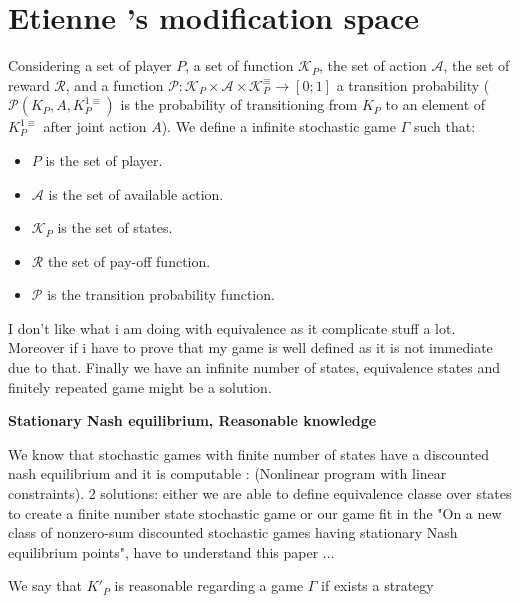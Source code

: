 \section{Etienne 's modification space}

\begin{mydef}
	Considering a set of player $P$, a set of function $\mathcal{K}_P$, the set of action $\mathcal{A}$, the set of reward $\mathcal{R}$, and a function $\mathcal{P} : \mathcal{K}_P \times \mathcal{A} \times \mathcal{K}_P^\equiv \rightarrow [0;1]$ a transition probability ($\mathcal{P}(K_P,A,K_P^{1\equiv})$ is the probability of transitioning from $K_P$ to an element of $K_P^{1\equiv}$ after joint action $A$).
	We define a infinite stochastic game $\Gamma$  such that:
	\begin{itemize}
		\item $P$ is the set of player.
		\item $\mathcal{A}$ is the set of available action.
		\item $\mathcal{K}_P$ is the set of states.
		\item $\mathcal{R}$ the set of pay-off function.
		\item $\mathcal{P}$ is the transition probability function.
	\end{itemize}
\end{mydef}

\begin{myrem}
	I don't like what i am doing with equivalence as it complicate stuff a lot. Moreover if i have to prove that my game is well defined as it is not immediate due to that. Finally we have an infinite number of states, equivalence states and finitely repeated game might be a solution.
\end{myrem}

\medskip
\noindent
\textbf{Stationary Nash equilibrium, Reasonable knowledge}

We know that stochastic games with finite number of states have a discounted nash equilibrium and it is computable : (Nonlinear program with linear constraints). 2 solutions: either we are able to define equivalence classe over states to create a finite number state stochastic game or our game fit	 in the "On a new class of nonzero-sum discounted stochastic
games having stationary Nash equilibrium points", have to understand this paper ...

\begin{mydef}
	We say that $K'_P$ is reasonable regarding a game $\Gamma$ if exists a strategy 
\end{mydef}


